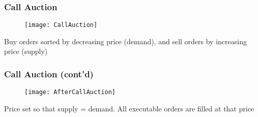 \documentclass[10pt]{beamer}
\begin{document}
	\begin{frame}
		\frametitle{Call Auction}
		
		\begin{figure}
			\texttt{[image: CallAuction]}
		\end{figure}	
		{\scriptsize Buy orders sorted by decreasing price (demand), and sell orders by increasing price (supply)}
		
	\end{frame}
	\begin{frame}
		\frametitle{Call Auction (cont'd)}
		
		\begin{figure}
			\texttt{[image: AfterCallAuction]}
		\end{figure}	
		{\scriptsize Price set so that supply = demand.
			All executable orders are filled at that price}
		
		
	\end{frame}
\end{document}
